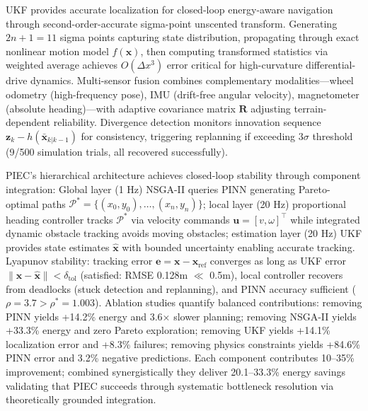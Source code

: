\documentclass[pdflatex,sn-nature]{sn-jnl}%
\begin{document}
UKF provides accurate localization for closed-loop energy-aware navigation through second-order-accurate sigma-point unscented transform. Generating $2n+1=11$ sigma points capturing state distribution, propagating through exact nonlinear motion model $f(\mathbf{x})$, then computing transformed statistics via weighted average achieves $O(\Delta x^3)$ error critical for high-curvature differential-drive dynamics. Multi-sensor fusion combines complementary modalities—wheel odometry (high-frequency pose), IMU (drift-free angular velocity), magnetometer (absolute heading)—with adaptive covariance matrix $\mathbf{R}$ adjusting terrain-dependent reliability. Divergence detection monitors innovation sequence $\mathbf{z}_k - h(\bar{\mathbf{x}}_{k|k-1})$ for consistency, triggering replanning if exceeding $3\sigma$ threshold (9/500 simulation trials, all recovered successfully).

PIEC's hierarchical architecture achieves closed-loop stability through component integration: Global layer (1 Hz) NSGA-II queries PINN generating Pareto-optimal paths $\mathcal{P}^* = \{(x_0,y_0), \ldots, (x_n,y_n)\}$; local layer (20 Hz) proportional heading controller tracks $\mathcal{P}^*$ via velocity commands $\mathbf{u}=[v,\omega]^\top$ while integrated dynamic obstacle tracking avoids moving obstacles; estimation layer (20 Hz) UKF provides state estimates $\hat{\mathbf{x}}$ with bounded uncertainty enabling accurate tracking. Lyapunov stability: tracking error $\mathbf{e} = \mathbf{x} - \mathbf{x}_{\text{ref}}$ converges as long as UKF error $\|\mathbf{x}-\hat{\mathbf{x}}\| < \delta_{\text{tol}}$ (satisfied: RMSE 0.128m $\ll$ 0.5m), local controller recovers from deadlocks (stuck detection and replanning), and PINN accuracy sufficient ($\rho=3.7 > \rho^*=1.003$). Ablation studies quantify balanced contributions: removing PINN yields +14.2\% energy and 3.6× slower planning; removing NSGA-II yields +33.3\% energy and zero Pareto exploration; removing UKF yields +14.1\% localization error and +8.3\% failures; removing physics constraints yields +84.6\% PINN error and 3.2\% negative predictions. Each component contributes 10--35\% improvement; combined synergistically they deliver 20.1--33.3\% energy savings validating that PIEC succeeds through systematic bottleneck resolution via theoretically grounded integration.
\end{document}
